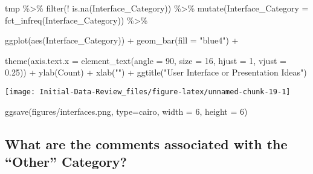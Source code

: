 \documentclass[
]{article}
\newenvironment{Shaded}{\begin{snugshade}}{\end{snugshade}}
\newcommand{\AttributeTok}[1]{\textcolor[rgb]{0.77,0.63,0.00}{#1}}
\newcommand{\DecValTok}[1]{\textcolor[rgb]{0.00,0.00,0.81}{#1}}
\newcommand{\FloatTok}[1]{\textcolor[rgb]{0.00,0.00,0.81}{#1}}
\newcommand{\FunctionTok}[1]{\textcolor[rgb]{0.00,0.00,0.00}{#1}}
\newcommand{\NormalTok}[1]{#1}
\newcommand{\SpecialCharTok}[1]{\textcolor[rgb]{0.00,0.00,0.00}{#1}}
\newcommand{\StringTok}[1]{\textcolor[rgb]{0.31,0.60,0.02}{#1}}
\begin{document}
\begin{Shaded}
\begin{Highlighting}[]
\NormalTok{tmp }\SpecialCharTok{\%\textgreater{}\%}
  \FunctionTok{filter}\NormalTok{(}\SpecialCharTok{!} \FunctionTok{is.na}\NormalTok{(Interface\_Category))  }\SpecialCharTok{\%\textgreater{}\%}
  \FunctionTok{mutate}\NormalTok{(}\AttributeTok{Interface\_Category =} \FunctionTok{fct\_infreq}\NormalTok{(Interface\_Category)) }\SpecialCharTok{\%\textgreater{}\%}
   
  \FunctionTok{ggplot}\NormalTok{(}\FunctionTok{aes}\NormalTok{(Interface\_Category)) }\SpecialCharTok{+}
  \FunctionTok{geom\_bar}\NormalTok{(}\AttributeTok{fill =} \StringTok{"blue4"}\NormalTok{) }\SpecialCharTok{+}

  \FunctionTok{theme}\NormalTok{(}\AttributeTok{axis.text.x =} \FunctionTok{element\_text}\NormalTok{(}\AttributeTok{angle =} \DecValTok{90}\NormalTok{, }\AttributeTok{size =} \DecValTok{16}\NormalTok{,}
                                   \AttributeTok{hjust =} \DecValTok{1}\NormalTok{, }\AttributeTok{vjust =} \FloatTok{0.25}\NormalTok{)) }\SpecialCharTok{+}
  \FunctionTok{ylab}\NormalTok{(}\StringTok{\textquotesingle{}Count\textquotesingle{}}\NormalTok{) }\SpecialCharTok{+}
  \FunctionTok{xlab}\NormalTok{(}\StringTok{""}\NormalTok{) }\SpecialCharTok{+}
  \FunctionTok{ggtitle}\NormalTok{(}\StringTok{"User Interface or Presentation Ideas"}\NormalTok{)}
\end{Highlighting}
\end{Shaded}

\begin{center}\texttt{[image: Initial-Data-Review\_files/figure-latex/unnamed-chunk-19-1]} \end{center}

\begin{Shaded}
\begin{Highlighting}[]
\FunctionTok{ggsave}\NormalTok{(}\StringTok{\textquotesingle{}figures/interfaces.png\textquotesingle{}}\NormalTok{, }\AttributeTok{type=}\StringTok{\textquotesingle{}cairo\textquotesingle{}}\NormalTok{,}
         \AttributeTok{width =} \DecValTok{6}\NormalTok{, }\AttributeTok{height =} \DecValTok{6}\NormalTok{)}
\end{Highlighting}
\end{Shaded}

\hypertarget{what-are-the-comments-associated-with-the-other-category-1}{%
\subsection{What are the comments associated with the ``Other''
Category?}\label{what-are-the-comments-associated-with-the-other-category-1}}
\end{document}
